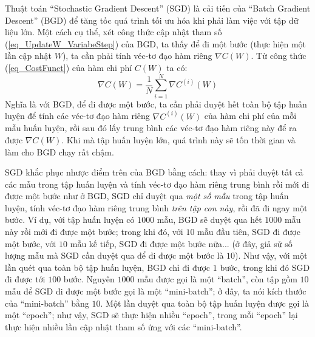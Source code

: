 Thuật toán ``Stochastic Gradient Descent'' (SGD) là cải tiến của ``Batch Gradient Descent'' (BGD) để tăng tốc quá trình tối ưu hóa khi phải làm việc với tập dữ liệu lớn. Một cách cụ thể, xét công thức cập nhật tham số (\ref{eq_UpdateW_VariabeStep}) của BGD, ta thấy để đi một bước (thực hiện một lần cập nhật $W$), ta cần phải tính véc-tơ đạo hàm riêng $\nabla C(W)$. Từ công thức (\ref{eq_CostFunct}) của hàm chi phí $C(W)$ ta có:
\begin{equation}
	\nabla C(W) = \frac{1}{N} \sum_{i=1}^N \nabla C^{(i)}(W)
\end{equation}
Nghĩa là với BGD, để đi được một bước, ta cần phải duyệt hết toàn bộ tập huấn luyện để tính các véc-tơ đạo hàm riêng $\nabla C^{(i)}(W)$ của hàm chi phí của mỗi mẫu huấn luyện, rồi sau đó lấy trung bình các véc-tơ đạo hàm riêng này để ra được $\nabla C(W)$. Khi mà tập huấn luyện lớn, quá trình này sẽ tốn thời gian và làm cho BGD chạy rất chậm.

SGD khắc phục nhược điểm trên của BGD bằng cách: thay vì phải duyệt tất cả các mẫu trong tập huấn luyện và tính véc-tơ đạo hàm riêng trung bình rồi mới đi được một bước như ở BGD, SGD chỉ duyệt qua \emph{một số mẫu} trong tập huấn luyện, tính véc-tơ đạo hàm riêng trung bình \emph{trên tập con này}, rồi đã đi ngay một bước. Ví dụ, với tập huấn luyện có $1000$ mẫu, BGD sẽ duyệt qua hết $1000$ mẫu này rồi mới đi được một bước; trong khi đó, với $10$ mẫu đầu tiên, SGD đi được một bước, với $10$ mẫu kế tiếp, SGD đi được một bước nữa... (ở đây, giả sử số lượng mẫu mà SGD cần duyệt qua để đi được một bước là $10$). Như vậy, với một lần quét qua toàn bộ tập huấn luyện, BGD chỉ đi được $1$ bước, trong khi đó SGD đi được tới $100$ bước. Nguyên $1000$ mẫu được gọi là một ``batch'', còn tập gồm $10$ mẫu để SGD đi được một bước gọi là một ``mini-batch''; ở đây, ta nói kích thước của ``mini-batch'' bằng $10$. Một lần duyệt qua toàn bộ tập huấn luyện được gọi là một ``epoch''; như vậy, SGD sẽ thực hiện nhiều ``epoch'', trong mỗi ``epoch'' lại thực hiện nhiều lần cập nhật tham số ứng với các ``mini-batch''.

